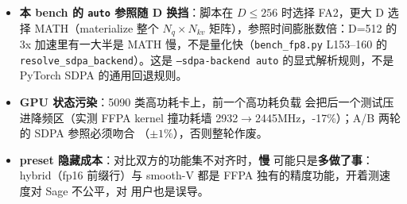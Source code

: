 \begin{itemize}[itemsep=0pt,topsep=2pt]
  \item \textbf{本 bench 的 \texttt{auto} 参照随 D 换挡}：脚本在
        $D\le256$ 时选择 FA2，更大 D 选择 MATH（materialize 整个
        $N_q\times N_{kv}$ 矩阵），参照时间膨胀数倍：D=512 的 3x
        加速里有一大半是 MATH 慢，不是量化快（\texttt{bench\_fp8.py}
        L153--160 的 \texttt{resolve\_sdpa\_backend}）。这是
        \texttt{--sdpa-backend auto} 的显式解析规则，不是 PyTorch
        SDPA 的通用回退规则。
  \item \textbf{GPU 状态污染}：5090 类高功耗卡上，前一个高功耗负载
        会把后一个测试压进降频区（实测 FFPA kernel 撞功耗墙
        2932$\to$2445MHz，-17\%）；A/B 两轮的 SDPA 参照必须吻合
        （$\pm1\%$），否则整轮作废。
  \item \textbf{preset 隐藏成本}：对比双方的功能集不对齐时，\textbf{慢}
        可能只是\textbf{多做了事}：hybrid（fp16 前缀行）与 smooth-V
        都是 FFPA 独有的精度功能，开着测速度对 Sage 不公平，对
        用户也是误导。
\end{itemize}

